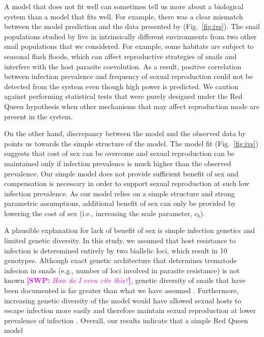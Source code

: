 \documentclass{article}\usepackage[]{graphicx}\usepackage[]{color}
\newcommand{\comment}[3]{\textcolor{#1}{\textbf{[#2: }\textit{#3}\textbf{]}}}
\newcommand{\swp}[1]{\comment{magenta}{SWP}{#1}}
\newcommand{\fref}[1]{Fig.~\ref{fig:#1}}
\begin{document}
A model that does not fit well can sometimes tell us more about a biological system than a model that fits well.
For example, there was a clear mismatch between the model prediction and the data presented by \cite{dagan2013clonal} (\fref{ivs}).
The snail populations studied by \cite{dagan2013clonal} live in intrinsically different environments from two other snail populations that we considered.
For example, some habitats are subject to seasonal flash floods, which can affect reproductive strategies of snails \citep{ben2007temporal} and interfere with the host parasite coevolution.
As a result, positive correlation between infection prevalence and frequency of sexual reproduction could not be detected from the system even though high power is predicted.
We caution against performing statistical tests that were purely designed under the Red Queen hypothesis when other mechanisms that may affect reproduction mode are present in the system.

On the other hand, discrepancy between the model and the observed data by \cite{mckone2016fine} points us towards the simple structure of the model.
The model fit (\fref{ivs}) suggests that cost of sex can be overcome and sexual reproduction can be maintained only if infection prevalence is much higher than the observed prevalence.
Our simple model does not provide sufficient benefit of sex and compensation is necessary in order to support sexual reproduction at such low infection prevalence.
As our model relies on a simple structure and strong parametric assumptions, additional benefit of sex can only be provided by lowering the cost of sex (i.e., increasing the scale parameter, $c_b$).

A plausible explanation for lack of benefit of sex is simple infection genetics and limited genetic diversity.
In this study, we assumed that host resistance to infection is deteremined entirely by two biallelic loci, which result in 10 genotypes.
Although exact genetic architecture that determines trematode infecion in snails (e.g., number of loci involved in parasite resistance) is not known \swp{How do I even cite this?}, genetic diversity of snails that have been documented is far greater than what we have assumed \citep{king2011parasites, dagan2013clonal}.
Furthermore, increasing genetic diversity of the model would have allowed sexual hosts to escape infection more easily and therefore maintain sexual reproduction at lower prevalence of infection \citep{lively2010effect, king2012does, ashby2015diversity}.
Overall, our results indicate that a simple Red Queen model 
\end{document}
